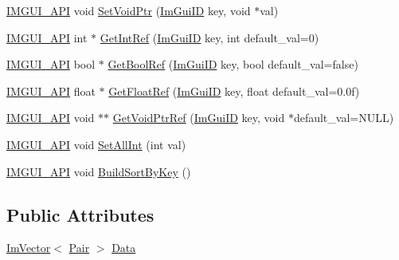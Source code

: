 \begin{DoxyCompactItemize}
\item 
\mbox{\hyperlink{imgui_8h_a43829975e84e45d1149597467a14bbf5}{I\+M\+G\+U\+I\+\_\+\+A\+PI}} void \mbox{\hyperlink{struct_im_gui_storage_a55f840086b3ec9cf63c67f02d159204a}{Set\+Void\+Ptr}} (\mbox{\hyperlink{imgui_8h_a1785c9b6f4e16406764a85f32582236f}{Im\+Gui\+ID}} key, void $\ast$val)
\item 
\mbox{\hyperlink{imgui_8h_a43829975e84e45d1149597467a14bbf5}{I\+M\+G\+U\+I\+\_\+\+A\+PI}} int $\ast$ \mbox{\hyperlink{struct_im_gui_storage_a28673fa7839263f3066ccb8e93e748a9}{Get\+Int\+Ref}} (\mbox{\hyperlink{imgui_8h_a1785c9b6f4e16406764a85f32582236f}{Im\+Gui\+ID}} key, int default\+\_\+val=0)
\item 
\mbox{\hyperlink{imgui_8h_a43829975e84e45d1149597467a14bbf5}{I\+M\+G\+U\+I\+\_\+\+A\+PI}} bool $\ast$ \mbox{\hyperlink{struct_im_gui_storage_aeb0d62100453d710bac5f6ad0a6e6a2e}{Get\+Bool\+Ref}} (\mbox{\hyperlink{imgui_8h_a1785c9b6f4e16406764a85f32582236f}{Im\+Gui\+ID}} key, bool default\+\_\+val=false)
\item 
\mbox{\hyperlink{imgui_8h_a43829975e84e45d1149597467a14bbf5}{I\+M\+G\+U\+I\+\_\+\+A\+PI}} float $\ast$ \mbox{\hyperlink{struct_im_gui_storage_a4b51cc8c92c65d4224af65a8ce7752ee}{Get\+Float\+Ref}} (\mbox{\hyperlink{imgui_8h_a1785c9b6f4e16406764a85f32582236f}{Im\+Gui\+ID}} key, float default\+\_\+val=0.\+0f)
\item 
\mbox{\hyperlink{imgui_8h_a43829975e84e45d1149597467a14bbf5}{I\+M\+G\+U\+I\+\_\+\+A\+PI}} void $\ast$$\ast$ \mbox{\hyperlink{struct_im_gui_storage_a2b203317f3f488818e9b9f416fe35332}{Get\+Void\+Ptr\+Ref}} (\mbox{\hyperlink{imgui_8h_a1785c9b6f4e16406764a85f32582236f}{Im\+Gui\+ID}} key, void $\ast$default\+\_\+val=N\+U\+LL)
\item 
\mbox{\hyperlink{imgui_8h_a43829975e84e45d1149597467a14bbf5}{I\+M\+G\+U\+I\+\_\+\+A\+PI}} void \mbox{\hyperlink{struct_im_gui_storage_ae5ee60618c4ce8e2b4ce0e5543d52992}{Set\+All\+Int}} (int val)
\item 
\mbox{\hyperlink{imgui_8h_a43829975e84e45d1149597467a14bbf5}{I\+M\+G\+U\+I\+\_\+\+A\+PI}} void \mbox{\hyperlink{struct_im_gui_storage_a5eae75e98a65c146e99898e359225f99}{Build\+Sort\+By\+Key}} ()
\end{DoxyCompactItemize}
\subsection*{Public Attributes}
\begin{DoxyCompactItemize}
\item 
\mbox{\hyperlink{class_im_vector}{Im\+Vector}}$<$ \mbox{\hyperlink{struct_im_gui_storage_1_1_pair}{Pair}} $>$ \mbox{\hyperlink{struct_im_gui_storage_aab0b9789fac598a34c500459259fde42}{Data}}
\end{DoxyCompactItemize}


